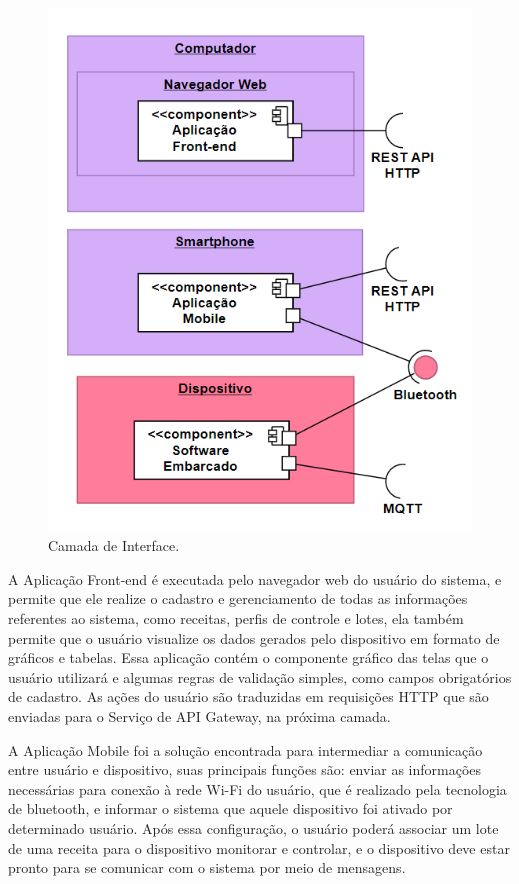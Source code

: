 \begin{figure}[h]
    \centering
    \includegraphics[scale=0.50]{figuras/projeto/software/camada_interface.PNG}
    \caption{Camada de Interface.}
    \label{fig:camada_interface}
\end{figure}

A Aplicação Front-end é executada pelo navegador web do usuário do sistema, e permite que ele realize o cadastro e gerenciamento de todas as informações referentes ao sistema, como receitas, perfis de controle e lotes, ela também permite que o usuário visualize os dados gerados pelo dispositivo em formato de gráficos e tabelas. Essa aplicação contém o componente gráfico das telas que o usuário utilizará e algumas regras de validação simples, como campos obrigatórios de cadastro. As ações do usuário são traduzidas em requisições HTTP que são enviadas para o Serviço de API Gateway, na próxima camada. 

A Aplicação Mobile foi a solução encontrada para intermediar a comunicação entre usuário e dispositivo, suas principais funções são: enviar as informações necessárias para conexão à rede Wi-Fi do usuário, que é realizado pela tecnologia de bluetooth, e informar o sistema que aquele dispositivo foi ativado por determinado usuário. Após essa configuração, o usuário poderá associar um lote de uma receita para o dispositivo monitorar e controlar, e o dispositivo deve estar pronto para se comunicar com o sistema por meio de mensagens.

